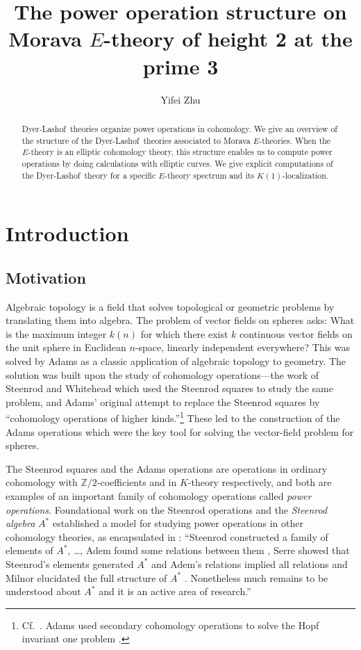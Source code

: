 \documentclass{gtpart}
\title{The power operation structure on Morava $E$-theory of height 2 at the prime 3}
\author{Yifei Zhu}
\theoremstyle{definition}
\theoremstyle{remark}
\newcommand{\mb}[1]{\mathbb{#1}}
\newcommand{\DL}{Dyer-Lashof~}
\newcommand{\BZ}{{\mb Z}}
\numberwithin{equation}{section}
\numberwithin{thm}{section}
\begin{document}
\begin{abstract}
 \DL theories organize power operations in cohomology.  We give an 
 overview of the structure of the \DL theories associated to Morava 
 $E$-theories.  When the $E$-theory is an elliptic cohomology theory, 
 this structure enables us to compute power operations by doing 
 calculations with elliptic curves.  We give explicit computations of 
 the \DL theory for a specific $E$-theory spectrum and its 
 $K(1)$-localization.  
\end{abstract}

\maketitle

\tableofcontents

\newpage
\section{Introduction}

\subsection{Motivation}
\label{subsec:mot}

Algebraic topology is a field that solves topological or geometric 
problems by translating them into algebra.  The problem of vector fields 
on spheres asks: What is the maximum integer $k(n)$ for which there 
exist $k$ continuous vector fields on the unit sphere in Euclidean 
$n$-space, linearly independent everywhere?  This was solved by Adams 
\cite{adamsvector} as a classic application of algebraic topology to 
geometry.  The solution was built upon the study of cohomology 
operations---the work of Steenrod and Whitehead \cite{steenrodwhitehead} 
which used the Steenrod squares to study the same problem, and Adams' 
original attempt to replace the Steenrod squares by ``cohomology 
operations of higher kinds.''\footnote{Cf.~\cite[Section 2]{adamsvector}.  
Adams used secondary cohomology operations to solve the Hopf invariant 
one problem \cite{adamshopf}.  }  These led to the construction of the 
Adams operations which were the key tool for solving the vector-field 
problem for spheres.  

The Steenrod squares and the Adams operations are operations in ordinary 
cohomology with $\BZ/2$-coefficients and in $K$-theory respectively, and 
both are examples of an important family of cohomology operations called 
{\em power operations}.  Foundational work on the Steenrod operations 
and the {\em Steenrod algebra} $A^*$ established a model for studying 
power operations in other cohomology theories, as encapsulated in 
\cite[Section 1]{blind}: ``Steenrod constructed a family of elements of 
$A^*$, \ldots \cite{steenrod}, Adem found some relations between them 
\cite{adem}, Serre showed that Steenrod's elements generated $A^*$ and 
Adem's relations implied all relations \cite{serre} and Milnor 
elucidated the full structure of $A^*$ \cite{milnor}.  Nonetheless much 
remains to be understood about $A^*$ and it is an active area of 
research.''  
\end{document}
